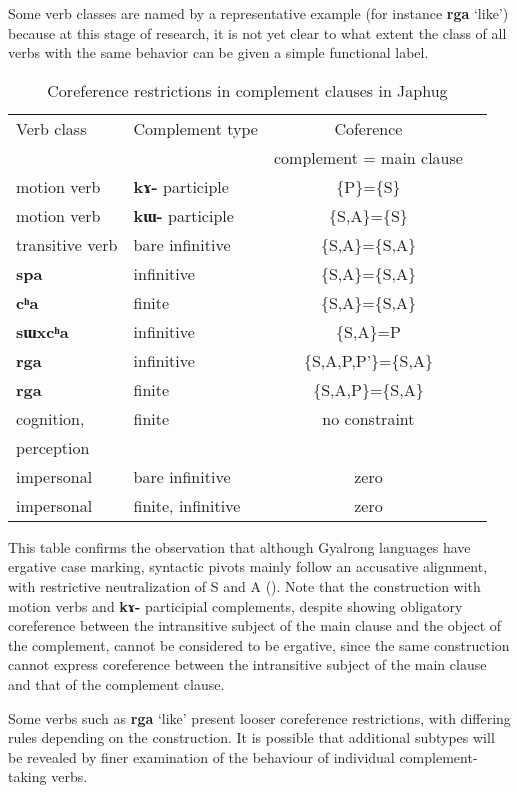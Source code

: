 \documentclass[oneside,a4paper,11pt]{article}
\newcommand{\ipa}[1]{\textbf{\phon#1}} %
\newcommand{\jpg}[2]{\ipa{#1} `#2'} %
\begin{document}
Some verb classes are named by a representative example (for instance \jpg{rga}{like}) because at this stage of research, it is not yet clear to what extent the class of all verbs with the same behavior can be given a simple functional label.

\begin{table}[H]
\caption{Coreference restrictions in complement clauses in Japhug} \label{tab:coref} \centering
\begin{tabular}{llcc}
\toprule
Verb class & 	Complement type & 	Coference & 	\\
&& complement = main clause \\
\midrule
motion verb & 	\ipa{kɤ-} participle & 	\{P\}=\{S\} & 	\\
\midrule
motion verb & 	\ipa{kɯ-} participle & 	\{S,A\}=\{S\} & 	\\
transitive verb & 	bare infinitive & 	\{S,A\}=\{S,A\} & 	\\
\ipa{spa} & 	infinitive & 	\{S,A\}=\{S,A\} & 	\\
\ipa{cʰa} & 	finite & 	\{S,A\}=\{S,A\} & 	\\
\ipa{sɯxcʰa} & 	infinitive & 	\{S,A\}=P & 	\\
\midrule
\ipa{rga} & 	infinitive & 	\{S,A,P,P'\}=\{S,A\} & 	\\
\ipa{rga} & 	finite & 	\{S,A,P\}=\{S,A\} & 	\\
\midrule
cognition, & finite & no constraint \\
perception \\
impersonal & 	bare infinitive & 	zero & 	\\
impersonal & 	finite, infinitive & 	zero & 	\\
\bottomrule
\end{tabular}
\end{table}

This table confirms the observation that although Gyalrong languages have ergative case marking, syntactic pivots mainly follow an accusative alignment, with restrictive neutralization of S and A (\citealt{jackson03caodeng, jacques16relatives}). Note that the construction with motion verbs and \ipa{kɤ-} participial complements, despite showing obligatory coreference between the intransitive subject of the main clause and the object of the complement, cannot be considered to be ergative, since the same construction cannot express coreference between the intransitive subject of the main clause and that of the complement clause.

Some verbs such as \jpg{rga}{like} present looser coreference restrictions, with differing rules depending on the construction. It is possible that additional subtypes will be revealed by finer examination of the behaviour of individual complement-taking verbs.
\end{document}
